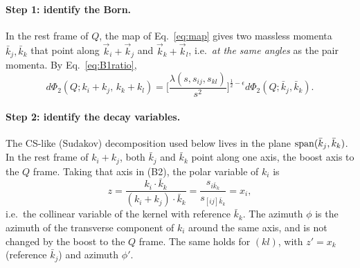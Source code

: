 \documentclass[11pt,a4paper]{article}
\newcommand{\jb}{\bar k_{j}}
\newcommand{\kb}{\bar k_{k}}
\newcommand{\eps}{\epsilon}
\begin{document}
\paragraph{Step 1: identify the Born.} In the rest frame of $Q$, the map of Eq.~\eqref{eq:map} gives two massless momenta
$\jb,\kb$ that point along $\vec k_i+\vec k_j$ and $\vec k_k+\vec k_l$, i.e.\ \emph{at the same angles} as the pair momenta.
By Eq.~\eqref{eq:B1ratio},
\begin{equation}
d\Phi_2(Q;k_i\!+\!k_j,\,k_k\!+\!k_l)=\Big[\frac{\lambda(s,s_{ij},s_{kl})}{s^2}\Big]^{\frac12-\eps}d\Phi_2(Q;\jb,\kb).
\end{equation}

\paragraph{Step 2: identify the decay variables.} The CS-like (Sudakov) decomposition used below lives in the plane
${\rm span}(\jb,\kb)$. In the rest frame of $k_i+k_j$, both $\jb$ and $\kb$ point along one axis, the boost axis to the $Q$ frame.
Taking that axis in (B2), the polar variable of $k_i$ is
\begin{equation}
z=\frac{k_i\cdot\kb}{(k_i+k_j)\cdot\kb}=\frac{s_{i\kb}}{s_{[ij]\kb}}=x_i,
\end{equation}
i.e.\ the collinear variable of the kernel with reference $\kb$. The azimuth $\phi$ is the azimuth of the transverse component
of $k_i$ around the same axis, and is not changed by the boost to the $Q$ frame. The same holds for $(kl)$, with $z'=x_k$ (reference $\jb$) and azimuth $\phi'$.
\end{document}
